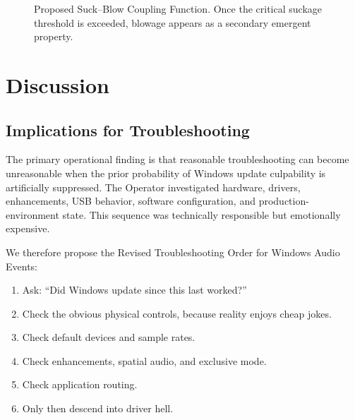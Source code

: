 \documentclass[10pt,twocolumn]{article}
\begin{document}
\begin{figure}[h]
\centering
{}
\caption{Proposed Suck--Blow Coupling Function. Once the critical suckage threshold is exceeded, blowage appears as a secondary emergent property.}
\label{fig:coupling}
\end{figure}

\section{Discussion}

\subsection{Implications for Troubleshooting}

The primary operational finding is that reasonable troubleshooting can become unreasonable when the prior probability of Windows update culpability is artificially suppressed. The Operator investigated hardware, drivers, enhancements, USB behavior, software configuration, and production-environment state. This sequence was technically responsible but emotionally expensive.

We therefore propose the Revised Troubleshooting Order for Windows Audio Events:

\begin{enumerate}
\item Ask: ``Did Windows update since this last worked?''
\item Check the obvious physical controls, because reality enjoys cheap jokes.
\item Check default devices and sample rates.
\item Check enhancements, spatial audio, and exclusive mode.
\item Check application routing.
\item Only then descend into driver hell.
\end{enumerate}
\end{document}
